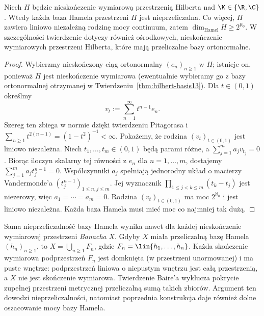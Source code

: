 \begin{twierdzenie}
\label{thm:hilbert-hamel-uncountable13}
Niech $H$ będzie nieskończenie wymiarową przestrzenią Hilberta
nad $\K\in\{\R,\C\}$. Wtedy każda baza Hamela przestrzeni $H$
jest nieprzeliczalna. Co więcej, $H$ zawiera liniowo niezależną
rodzinę mocy continuum, zatem
$\dim_{\mathrm{Hamel}}H\ge 2^{\aleph_0}$.
W szczególności twierdzenie dotyczy również ośrodkowych,
nieskończenie wymiarowych przestrzeni Hilberta, które mają
przeliczalne bazy ortonormalne.
\end{twierdzenie}
\begin{proof}
Wybierzmy nieskończony ciąg ortonormalny $(e_n)_{n\ge1}$
w $H$; istnieje on, ponieważ $H$ jest nieskończenie wymiarowa
(ewentualnie wybieramy go z bazy ortonormalnej otrzymanej
w Twierdzeniu~\ref{thm:hilbert-basis13}). Dla $t\in(0,1)$
określmy
\[
 v_t:=\sum_{n=1}^{\infty}t^{n-1}e_n.
\]
Szereg ten zbiega w normie dzięki twierdzeniu Pitagorasa i
$\sum_{n\ge1}t^{2(n-1)}=(1-t^2)^{-1}<\infty$.
Pokażemy, że rodzina $(v_t)_{t\in(0,1)}$ jest liniowo niezależna.
Niech $t_1,\ldots,t_m\in(0,1)$ będą parami różne, a
$\sum_{j=1}^m a_jv_{t_j}=0$. Biorąc iloczyn skalarny tej
równości z $e_n$ dla $n=1,\ldots,m$, dostajemy
$\sum_{j=1}^m a_jt_j^{n-1}=0$. Współczynniki $a_j$
spełniają jednorodny układ o macierzy Vandermonde'a
$(t_j^{n-1})_{1\le n,j\le m}$. Jej wyznacznik
$\prod_{1\le j<k\le m}(t_k-t_j)$ jest niezerowy, więc
$a_1=\cdots=a_m=0$. Rodzina $(v_t)_{t\in(0,1)}$ ma moc
$2^{\aleph_0}$ i jest liniowo niezależna. Każda baza Hamela
musi mieć moc co najmniej tak dużą.
\end{proof}

\begin{uwaga}
\label{rem:hilbert-hamel-baire13}
Sama nieprzeliczalność bazy Hamela wynika nawet dla każdej
nieskończenie wymiarowej przestrzeni \emph{Banacha} $X$.
Gdyby $X$ miała przeliczalną bazę Hamela $(h_n)_{n\ge1}$,
to $X=\bigcup_{n\ge1}F_n$, gdzie
$F_n=\lin\{h_1,\ldots,h_n\}$. Każda skończenie wymiarowa
podprzestrzeń $F_n$ jest domknięta (w przestrzeni unormowanej)
i ma puste wnętrze: podprzestrzeń liniowa o niepustym wnętrzu
jest całą przestrzenią, a $X$ nie jest skończenie wymiarowa.
Twierdzenie Baire'a wyklucza pokrycie zupełnej przestrzeni
metrycznej przeliczalną sumą takich zbiorów.
Argument ten dowodzi nieprzeliczalności, natomiast poprzednia
konstrukcja daje również dolne oszacowanie mocy bazy Hamela.
\end{uwaga}

